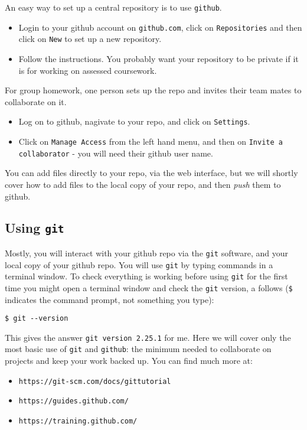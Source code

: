 \documentclass[10pt] {article}
\theoremstyle{definition}
\begin{document}
An easy way to set up a central repository is to use {\tt github}.  
\begin{itemize}
\item Login to your github account on {\tt github.com}, click on {\tt Repositories} and then click on {\tt New} to set up a new repository.
\item Follow the instructions. You probably want your repository to be private if it is for working on assessed coursework.
\end{itemize}
For group homework, one person sets up the repo and invites their team mates to collaborate on it. 
\begin{itemize}
\item Log on to github, nagivate to your repo, and click on {\tt Settings}.
\item Click on {\tt Manage Access} from the left hand menu, and then on {\tt Invite a collaborator} - you will need their github user name. 
\end{itemize}
You can add files directly to your repo, via the web interface, but we will shortly cover how to add files to the local copy of your repo, and then {\em push} them to github. 

\subsection{Using {\tt git}}

Mostly, you will interact with your github repo via the {\tt git} software, and your local copy of your github repo. You will use {\tt git} by typing commands in a terminal window. To check everything is working before using {\tt git} for the first time you might open a terminal window and check the {\tt git} version, a follows (\verb+$+ indicates the command prompt, not something you type):
\begin{verbatim}
$ git --version
\end{verbatim}
This gives the answer \verb+git version 2.25.1+ for me. Here we will cover only the most basic use of {\tt git} and {\tt github}: the minimum needed to collaborate on projects and keep your work backed up. You can find much more at:
\begin{itemize}
\item \verb+https://git-scm.com/docs/gittutorial+
\item \verb+https://guides.github.com/+
\item \verb+https://training.github.com/+
\end{itemize}
\end{document}
